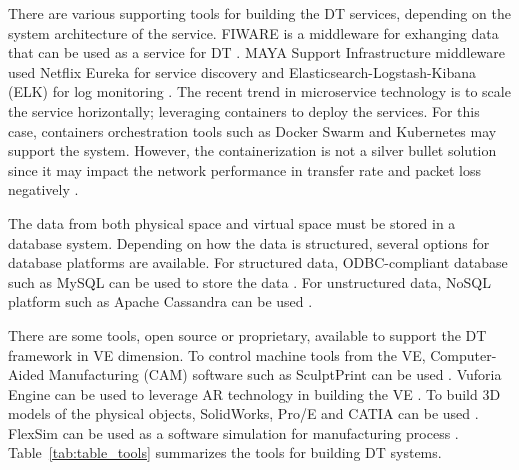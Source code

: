\documentclass[article,table]{aaltoseries}
\begin{document}
There are various supporting tools for building the DT services, depending on the system architecture of the service. FIWARE is a middleware for exhanging data that can be used as a service for DT \cite{Schroeder2016automationml}. MAYA Support Infrastructure middleware used Netflix Eureka for service discovery and Elasticsearch-Logstash-Kibana (ELK) for log monitoring \cite{ciavotta2017microservice}. The recent trend in microservice technology is to scale the service horizontally; leveraging containers to deploy the services. For this case, containers orchestration tools such as Docker Swarm and Kubernetes may support the system. However, the containerization is not a silver bullet solution since it may impact the network performance in transfer rate and packet loss negatively \cite{kratzke2017microservices}.

The data from both physical space and virtual space must be stored in a database system. Depending on how the data is structured, several options for database platforms are available. For structured data, ODBC-compliant database such as MySQL can be used to store the data \cite{Zhang2017}. For unstructured data, NoSQL platform such as Apache Cassandra can be used \cite{ciavotta2017microservice}.

There are some tools, open source or proprietary, available to support the DT framework in VE dimension. To control machine tools from the VE, Computer-Aided Manufacturing (CAM) software such as SculptPrint can be used \cite{lynn2018realization}. Vuforia Engine can be used to leverage AR technology in building the VE \cite{schroeder2016visualising}. To build 3D models of the physical objects, SolidWorks, Pro/E and CATIA can be used \cite{Zhuang2018}. FlexSim can be used as a software simulation for manufacturing process \cite{Zhang2017}. Table~\ref{tab:table_tools} summarizes the tools for building DT systems.
\end{document}
